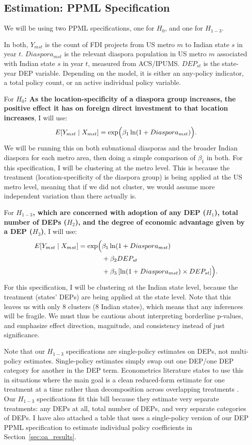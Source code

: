 \documentclass[12pt]{article}
\let\oldsubsection\subsection
\renewcommand{\subsection}{\FloatBarrier\oldsubsection}
\begin{document}
\subsection{Estimation: PPML Specification} \label{ss:specification}

We will be using two PPML specifications, one for $H_0$, and one for $H_{1-3}$. 

In both, $Y_{mst}$ is the count of FDI projects from US metro $m$ to Indian state $s$ in year $t$. $Diaspora_{mst}$ is the relevant diaspora population in US metro $m$ associated with Indian state $s$ in year $t$, measured from ACS/IPUMS. $DEP_{st}$ is the state-year DEP variable. Depending on the model, it is either an any-policy indicator, a total policy count, or an active individual policy variable.

For \textbf{$H_0$:  As the location-specificity of a diaspora group increases, the positive effect it has on foreign direct investment to that location increases}, I will use:
\[
E[Y_{mst} \mid X_{mst}] =
\exp \Bigl(
\beta_1 \ln(1+Diaspora_{mst})
\Bigr).
\]
We will be running this on both subnational diasporas and the broader Indian diaspora for each metro area, then doing a simple  comparison of $\beta_1$ in both. For this specification, I will be clustering at the metro level. This is because the treatment (location-specificity of the diaspora group) is being applied at the US metro level, meaning that if we did not cluster, we would assume more independent variation than there actually is.

For \textbf{$H_{1-3}$, which are concerned with adoption of any DEP ($H_1$), total number of DEPs ($H_2$), and the degree of economic advantage given by a DEP ($H_3$)}, I will use:
\[
\begin{aligned}
E[Y_{mst} \mid X_{mst}] =
\exp \Bigl(
&\beta_1 \ln(1+Diaspora_{mst}) \\
&+ \beta_2 DEP_{st} \\
&+ \beta_3 \left[\ln(1+Diaspora_{mst}) \times DEP_{st}\right] \Bigr).
\end{aligned}
\]
For this specification, I will be clustering at the Indian state level, because the treatment (states' DEPs) are being applied at the state level. Note that this leaves us with only 8 clusters (8 Indian states), which means that any inferences will be fragile. We must thus be cautious about interpreting borderline p-values, and emphasize effect direction, magnitude, and consistency instead of just significance.

Note that our $H_{1-3}$ specifications are single-policy estimates on DEPs, not multi-policy estimates. Single-policy estimates simply swap out one DEP/one DEP category for another in the DEP term. Econometrics literature states to use this in situations where the main goal is a clean reduced-form estimate for one treatment at a time rather than decomposition across overlapping treatments \citep{goldsmith-pinkham_estimating_2021}. Our $H_{1-3}$ specifications fit this bill because they estimate very separate treatments: any DEPs at all, total number of DEPs, and very separate categories of DEPs. I have also attached a table that uses a single-policy version of our DEP PPML specification to estimate individual policy coefficients in Section~\ref{sec:oa_results}.
\end{document}
